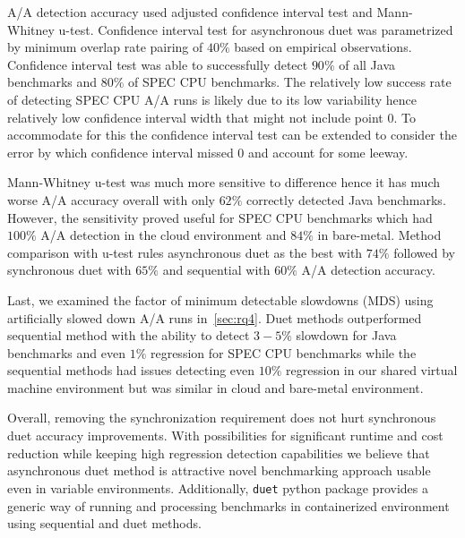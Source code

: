 A/A detection accuracy used adjusted confidence interval test and \mbox{Mann-Whitney} \mbox{u-test}.
Confidence interval test for asynchronous duet was parametrized by minimum overlap rate pairing of $40\%$ based on empirical observations.
Confidence interval test was able to successfully detect $90\%$ of all Java benchmarks and $80\%$ of SPEC CPU benchmarks.
The relatively low success rate of detecting SPEC CPU A/A runs is likely due to its low variability hence relatively low confidence interval width that might not include point $0$.
To accommodate for this the confidence interval test can be extended to consider the error by which confidence interval missed $0$ and account for some leeway.

\mbox{Mann-Whitney} \mbox{u-test} was much more sensitive to difference hence it has much worse A/A accuracy overall with only $62\%$ correctly detected Java benchmarks.
However, the sensitivity proved useful for SPEC CPU benchmarks which had $100\%$ A/A detection in the cloud environment and $84\%$ in \mbox{bare-metal}.
Method comparison with \mbox{u-test} rules asynchronous duet as the best with $74\%$ followed by synchronous duet with $65\%$ and sequential with $60\%$ A/A detection accuracy.

Last, we examined the factor of minimum detectable slowdowns (MDS) using artificially slowed down A/A runs in~\cref{sec:rq4}.
Duet methods outperformed sequential method with the ability to detect $3-5\%$ slowdown for Java benchmarks and even $1\%$ regression for SPEC CPU benchmarks while the sequential methods had issues detecting even $10\%$ regression in our shared virtual machine environment but was similar in cloud and bare-metal environment.

Overall, removing the synchronization requirement does not hurt synchronous duet accuracy improvements.
With possibilities for significant runtime and cost reduction while keeping high regression detection capabilities we believe that asynchronous duet method is attractive novel benchmarking approach usable even in variable environments.
Additionally, \lstinline{duet} python package provides a generic way of running and processing benchmarks in containerized environment using sequential and duet methods.

